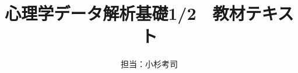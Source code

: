 \documentclass[uplatex]{jsbook}
\begin{document}
\title{心理学データ解析基礎1/2　教材テキスト}
\author{担当：小杉考司}
\maketitle
% 
% 
% 
% 
% 
% 
% 
% 
% 
% 
% 

% 
% 
% 
% 
% 
% 
% 
% 
% 
% 
% 
% 
% 
% 
% 
% 
% 
% 



\end{document}
